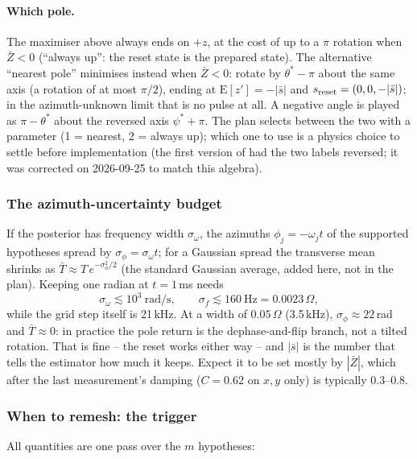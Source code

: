 \paragraph{Which pole.} The maximiser above always ends on $+z$, at the cost
of up to a $\pi$ rotation when $\bar Z < 0$ (``always up'': the reset state is the
prepared state). The alternative ``nearest pole'' minimises instead when $\bar Z
< 0$: rotate by $\theta^* - \pi$ about the same axis (a rotation of at most
$\pi/2$), ending at $\mathrm{E}[z'] = -|\bar s|$ and $s_{\rm reset} = (0, 0,
-|\bar s|)$; in the azimuth-unknown limit that is no pulse at all. A negative
angle is played as $\pi - \theta^*$ about the reversed axis $\psi^* + \pi$. The
plan selects between the two with a parameter  (1 = nearest,
2 = always up); which one to use is a physics choice to settle before
implementation (the first version of  had the two
labels reversed; it was corrected on 2026-09-25 to match this algebra).

\subsubsection{The azimuth-uncertainty budget}

If the posterior has frequency width $\sigma_\omega$, the azimuths
$\phi_j = -\omega_j t$ of the supported hypotheses spread by $\sigma_\phi =
\sigma_\omega t$; for a Gaussian spread the transverse mean shrinks as $\bar T
\approx T\,e^{-\sigma_\phi^2/2}$ (the standard Gaussian average, added here,
not in the plan). Keeping one radian at $t = 1$\,ms needs
\[
  \sigma_\omega \lesssim 10^3\ \mathrm{rad/s},\qquad \sigma_f \lesssim 160\ \mathrm{Hz} = 0.0023\,\Omega,
\]
while the grid step itself is 21\,kHz. At a width of $0.05\,\Omega$ (3.5\,kHz),
$\sigma_\phi \approx 22$\,rad and $\bar T \approx 0$: in practice the pole return is the
dephase-and-flip branch, not a tilted rotation. That is fine -- the reset
works either way -- and $|\bar s|$ is the number that tells the estimator how
much it keeps. Expect it to be set mostly by $|\bar Z|$, which after the last
measurement's damping ($C = 0.62$ on $x, y$ only) is typically 0.3--0.8.

\subsubsection{When to remesh: the trigger}

All quantities are one pass over the $m$ hypotheses:

